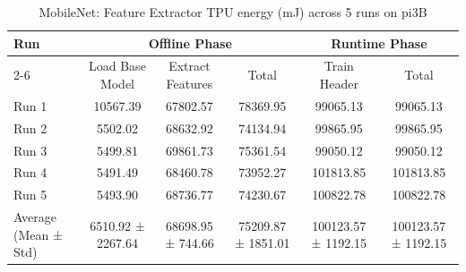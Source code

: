 \begin{table}[t]
\centering
\caption{MobileNet: Feature Extractor TPU energy (mJ) across 5 runs on pi3B}
\label{tab:energy_mobilenet_EdgeTPU_pi3B}
\begin{tabular}{lccccc}
\hline
\multirow{2}{*}{Run} & \multicolumn{3}{c}{Offline Phase} & \multicolumn{2}{c}{Runtime Phase} \\
\cline{2-6}
 & Load Base Model & Extract Features & Total & Train Header & Total \\
\hline
  Run 1                  & 10567.39       & 67802.57       & 78369.95       & 99065.13       & 99065.13       \\
  Run 2                  & 5502.02        & 68632.92       & 74134.94       & 99865.95       & 99865.95       \\
  Run 3                  & 5499.81        & 69861.73       & 75361.54       & 99050.12       & 99050.12       \\
  Run 4                  & 5491.49        & 68460.78       & 73952.27       & 101813.85      & 101813.85      \\
  Run 5                  & 5493.90        & 68736.77       & 74230.67       & 100822.78      & 100822.78      \\
\hline
  Average (Mean ± Std)   & 6510.92 ± 2267.64 & 68698.95 ± 744.66 & 75209.87 ± 1851.01 & 100123.57 ± 1192.15 & 100123.57 ± 1192.15 \\
\hline
\end{tabular}
\end{table}
